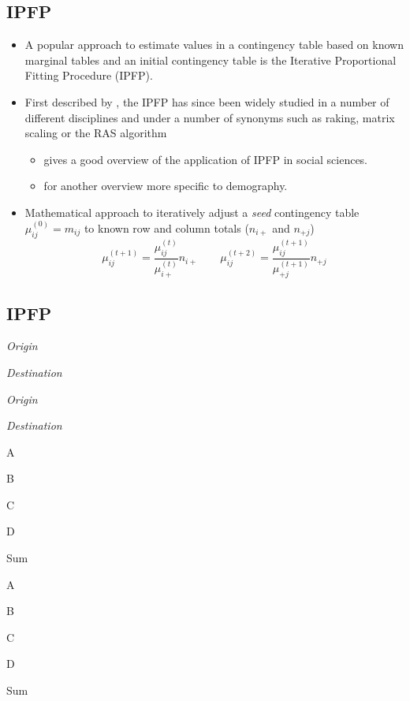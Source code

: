 \documentclass[
]{book}
\providecommand{\tightlist}{%
  \setlength{\itemsep}{0pt}\setlength{\parskip}{0pt}}
\begin{document}
\hypertarget{ipfp-3}{%
\subsection{IPFP}\label{ipfp-3}}

\begin{itemize}
\tightlist
\item
  A popular approach to estimate values in a contingency table based on known marginal tables and an initial contingency table is the Iterative Proportional Fitting Procedure (IPFP).
\item
  First described by \citet{Deming1940}, the IPFP has since been widely studied in a number of different disciplines and under a number of synonyms such as raking, matrix scaling or the RAS algorithm

  \begin{itemize}
  \tightlist
  \item
    \citet{Lovelace2015} gives a good overview of the application of IPFP in social sciences.
  \item
    \citet{Lomax2016} for another overview more specific to demography.
  \end{itemize}
\item
  Mathematical approach to iteratively adjust a \emph{seed} contingency table \(\mu_{ij}^{(0)} = m_{ij}\) to known row and column totals (\(n_{i+}\) and \(n_{+j}\))
  \[
  \mu_{ij}^{(t+1)} = \frac{\mu_{ij}^{(t)}}{\mu_{i+}^{(t)}}n_{i+} \qquad \mu_{ij}^{(t+2)} = \frac{\mu_{ij}^{(t+1)}}{\mu_{+j}^{(t+1)}}n_{+j}
  \]
\end{itemize}

\hypertarget{ipfp-4}{%
\subsection{IPFP}\label{ipfp-4}}

\emph{Origin}

\emph{Destination}

\emph{Origin}

\emph{Destination}

A

B

C

D

Sum

A

B

C

D

Sum
\end{document}

